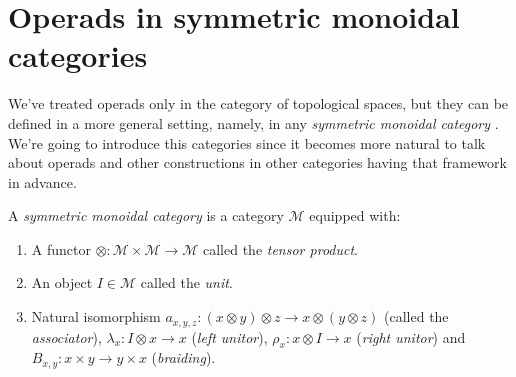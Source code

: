 \documentclass[TFM.tex]{subfiles}
\begin{document}

\section{Operads in symmetric monoidal categories}
We've treated operads only in the category of topological spaces, but they can be defined in a more general setting, namely, in any \emph{symmetric monoidal category} \cite{Yau}. We're going to introduce this categories since it becomes more natural to talk about operads and other constructions in other categories having that framework in advance.

\begin{defi}
A \emph{symmetric monoidal category} is a category $\mathscr{M}$ equipped with:
\begin{enumerate}[(1)]
\item A functor $\otimes: \mathscr{M}\times \mathscr{M}\to \mathscr{M}$ called the \emph{tensor product}.
\item An object $I\in \mathscr{M}$ called the \emph{unit}.
\item Natural isomorphism $a_{x,y,z} : (x \otimes y) \otimes z \to x \otimes (y \otimes z)$ (called the \emph{associator}), $\lambda_x : I \otimes x \to x$ (\emph{left unitor}), $\rho_x : x \otimes I \to x$ (\emph{right unitor}) and $B_{x,y}: x\times y\to y\times x$ (\emph{braiding}).
\end{enumerate}


\end{defi}
\end{document}
